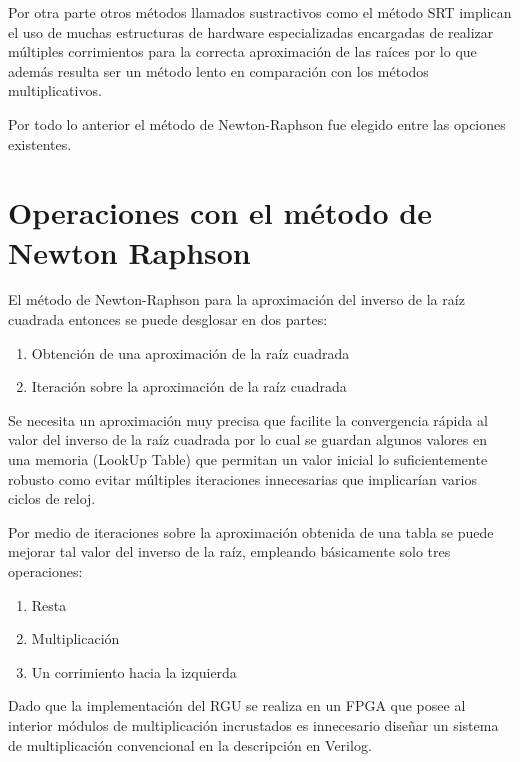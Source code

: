 Por otra parte otros métodos llamados sustractivos como el método SRT implican el uso de muchas estructuras de hardware especializadas encargadas de realizar múltiples corrimientos para la correcta aproximación de las raíces por lo que además resulta ser un método lento en comparación con los métodos multiplicativos. 

Por todo lo anterior el método de Newton-Raphson fue elegido entre las opciones existentes.

\section{Operaciones con el método de Newton Raphson}

El método de Newton-Raphson para la aproximación del inverso de la raíz cuadrada entonces se puede desglosar en dos partes: 

\begin{enumerate}

\item Obtención de una aproximación de la raíz cuadrada

\item Iteración sobre la aproximación de la raíz cuadrada

\end{enumerate}  
  
Se necesita un aproximación muy precisa que facilite la convergencia rápida al valor del inverso de la raíz cuadrada  por lo cual se guardan algunos valores en una memoria (LookUp Table) que permitan un valor inicial lo suficientemente robusto como evitar múltiples iteraciones innecesarias que implicarían varios ciclos de reloj. 
  
Por medio de iteraciones sobre la aproximación obtenida de una tabla se puede mejorar tal valor del inverso de la raíz, empleando básicamente solo tres operaciones:

\begin{enumerate}

\item Resta

\item Multiplicación

\item Un corrimiento hacia la izquierda

\end{enumerate} 

Dado que la implementación del RGU se realiza en un FPGA que posee al interior módulos de multiplicación incrustados es innecesario diseñar un sistema de multiplicación convencional en la descripción en Verilog.

